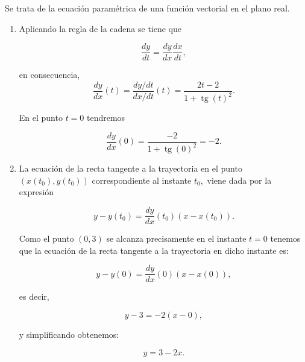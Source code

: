 \documentclass[
  spanish,
  a4paper,
]{scrreport}
\theoremstyle{definition}
\theoremstyle{remark}
\begin{document}
\begin{tcolorbox}[enhanced jigsaw, arc=.35mm, bottomrule=.15mm, bottomtitle=1mm, breakable, colback=white, colbacktitle=quarto-callout-tip-color!10!white, colframe=quarto-callout-tip-color-frame, coltitle=black, left=2mm, leftrule=.75mm, opacityback=0, opacitybacktitle=0.6, rightrule=.15mm, title=\textcolor{quarto-callout-tip-color}{\faLightbulb}\hspace{0.5em}{Solución}, titlerule=0mm, toprule=.15mm, toptitle=1mm]

Se trata de la ecuación paramétrica de una función vectorial en el plano
real.

\begin{enumerate}
\def\labelenumi{\alph{enumi}.}
\item
  Aplicando la regla de la cadena se tiene que

  \[
  \dfrac{dy}{dt} = \dfrac{dy}{dx}\dfrac{dx}{dt},
  \]

  en consecuencia, \[
  \dfrac{dy}{dx}(t) = \frac{dy/dt}{dx/dt}(t)=\frac{2t-2}{1+\operatorname{tg}(t)^2}.
  \]

  En el punto \(t=0\) tendremos

  \[
  \dfrac{dy}{dx}(0) = \frac{-2}{1+\operatorname{tg}(0)^2} = -2.
  \]
\item
  La ecuación de la recta tangente a la trayectoria en el punto
  \((x(t_0),y(t_0))\) correspondiente al instante \(t_0,\) viene dada
  por la expresión

  \[
  y-y(t_0) = \dfrac{dy}{dx}(t_0)(x-x(t_0)).
  \]

  Como el punto \((0,3)\) se alcanza precisamente en el instante \(t=0\)
  tenemos que la ecuación de la recta tangente a la trayectoria en dicho
  instante es:

  \[
  y-y(0) = \dfrac{dy}{dx}(0)(x-x(0)),
  \]

  es decir,

  \[
  y-3 = -2(x-0),
  \]

  y simplificando obtenemos:

  \[
  y = 3-2x.
  \]
\end{enumerate}

\end{tcolorbox}
\end{document}
